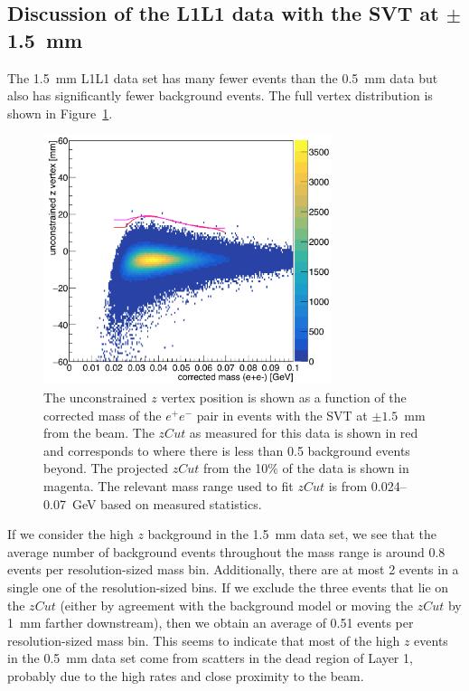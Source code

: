 \subsection{Discussion of the L1L1 data with the SVT at $\pm$1.5~mm}
The 1.5~mm L1L1 data set has many fewer events than the 0.5~mm data but also has significantly fewer background events. The full vertex distribution is shown in Figure~\ref{fig:zVm1p5_ub}.
\begin{figure}[htb]
  \centering
      \includegraphics[width=0.75\textwidth]{pics/results/zVm_1p5mm.png}
  \caption[Vertex position vs mass for the 100$\%$ L1L1 data at 1.5~mm]{The unconstrained $z$ vertex position is shown as a function of the corrected mass of the $e^+e^-$ pair in events with the SVT at $\pm1.5$~mm from the beam. The $zCut$ as measured for this data is shown in red and corresponds to where there is less than 0.5 background events beyond. The projected $zCut$ from the 10$\%$ of the data is shown in magenta. The relevant mass range used to fit $zCut$ is from 0.024--0.07~GeV based on measured statistics.}
  \label{fig:zVm1p5_ub}
\end{figure} 
If we consider the high $z$ background in the 1.5~mm data set, we see that the average number of background events throughout the mass range is around 0.8 events per resolution-sized mass bin. Additionally, there are at most 2 events in a single one of the resolution-sized bins. If we exclude the three events that lie on the $zCut$ (either by agreement with the background model or moving the $zCut$ by 1~mm farther downstream), then we obtain an average of 0.51 events per resolution-sized mass bin. This seems to indicate that most of the high $z$ events in the 0.5~mm data set come from scatters in the dead region of Layer 1, probably due to the high rates and close proximity to the beam.

